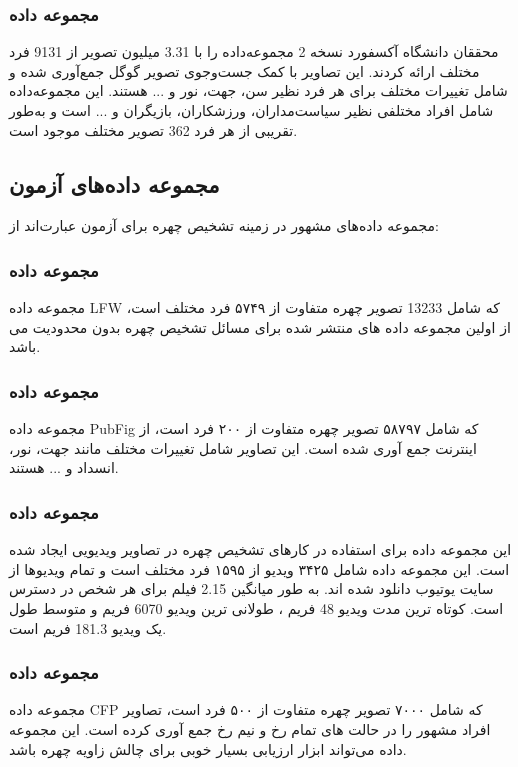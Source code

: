 \subsubsection{مجموعه داده }
محققان دانشگاه آکسفورد نسخه 2 مجموعه‌داده‌  را با 3.31 میلیون تصویر از 9131 فرد مختلف ارائه کردند. این تصاویر با کمک جست‌و‌جوی تصویر گوگل جمع‌آوری ‌شده و شامل تغییرات مختلف برای هر فرد نظیر سن، جهت، نور و ... هستند. این مجموعه‌داده شامل افراد مختلفی نظیر سیاست‌مداران، ورزشکاران، بازیگران و ... است و به‌طور تقریبی از هر فرد 362 تصویر مختلف موجود است. \cite{VGGFace2_dataset}

\subsection{مجموعه داده‌های آزمون}
مجموعه داده‌های مشهور در زمینه تشخیص چهره برای آزمون عبارت‌اند از:

\subsubsection{مجموعه داده }
مجموعه داده LFW  که شامل 13233 تصویر چهره متفاوت از ۵۷۴۹ فرد مختلف است، از اولین مجموعه داده های منتشر شده برای مسائل تشخیص چهره بدون محدودیت می باشد. \cite{LFW_dataset}

\subsubsection{مجموعه داده }
مجموعه داده PubFig  که شامل ۵۸۷۹۷ تصویر چهره متفاوت از ۲۰۰ فرد است، از اینترنت جمع آوری شده است. این تصاویر شامل تغییرات مختلف مانند جهت، نور، انسداد و ... هستند. \cite{PubFig_dataset}

\subsubsection{مجموعه داده }
این مجموعه داده برای استفاده در کارهای تشخیص چهره در تصاویر ویدیویی ایجاد شده است. این مجموعه داده شامل ۳۴۲۵ ویدیو از ۱۵۹۵ فرد مختلف است و تمام ویدیوها از سایت یوتیوب دانلود شده اند. به طور میانگین 2.15 فیلم برای هر شخص در دسترس است. کوتاه ترین مدت ویدیو 48 فریم ، طولانی ترین ویدیو 6070 فریم و متوسط طول یک ویدیو 181.3 فریم است. \cite{VGGFace2_dataset}

\subsubsection{مجموعه داده }
مجموعه داده CFP  که شامل ۷۰۰۰ تصویر چهره متفاوت از ۵۰۰ فرد است، تصاویر افراد مشهور را در حالت های تمام رخ و نیم رخ جمع آوری کرده است. این مجموعه داده می‌تواند ابزار ارزیابی بسیار خوبی برای چالش زاویه چهره باشد. \cite{LFW_dataset}

